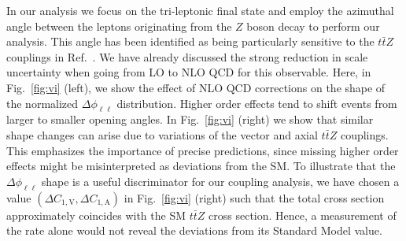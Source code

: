 \documentclass{JHEP3}
\def\ttbZ{t\bar{t}Z}
\def\DConeA{\Delta C_{1,\mathrm{A}}}
\def\DConeV{\Delta C_{1,\mathrm{V}}}
\begin{document}
In our analysis we focus on the tri-leptonic final state and employ the azimuthal angle between the leptons originating
from the $Z$ boson decay to perform our analysis.
This angle has been identified as being particularly sensitive to the $\ttbZ$ couplings in Ref.~\cite{Baur:2004uw}.
We have already discussed the strong reduction in scale uncertainty when going from LO to NLO QCD for this observable.
Here, in Fig.~\ref{fig:vi} (left), we show the effect of NLO QCD corrections on the shape of the normalized $\Delta \phi_{\ell\ell}$ distribution.
Higher order effects tend to shift events from larger to smaller opening angles.
In Fig.~\ref{fig:vi} (right) we show that similar shape changes can arise due to variations of the vector and axial $\ttbZ$ couplings.
This emphasizes the importance of precise predictions, since missing higher order effects might be misinterpreted as deviations from the SM.
To illustrate that the $\Delta \phi_{\ell\ell}$ shape is a useful discriminator for our coupling analysis, we have chosen 
a value $(\DConeV,\DConeA)$ in Fig.~\ref{fig:vi} (right) such that the total cross section approximately coincides with the SM $\ttbZ$ cross section.
Hence, a measurement of the rate alone would not reveal the deviations from its Standard Model value.
 
\end{document}
